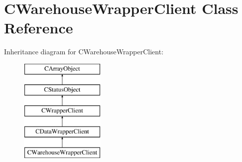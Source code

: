\hypertarget{class_c_warehouse_wrapper_client}{\section{C\-Warehouse\-Wrapper\-Client Class Reference}
\label{class_c_warehouse_wrapper_client}
}
Inheritance diagram for C\-Warehouse\-Wrapper\-Client\-:\begin{figure}[H]
\begin{center}
\leavevmode
\includegraphics[height=5.000000cm]{class_c_warehouse_wrapper_client}
\end{center}
\end{figure}
